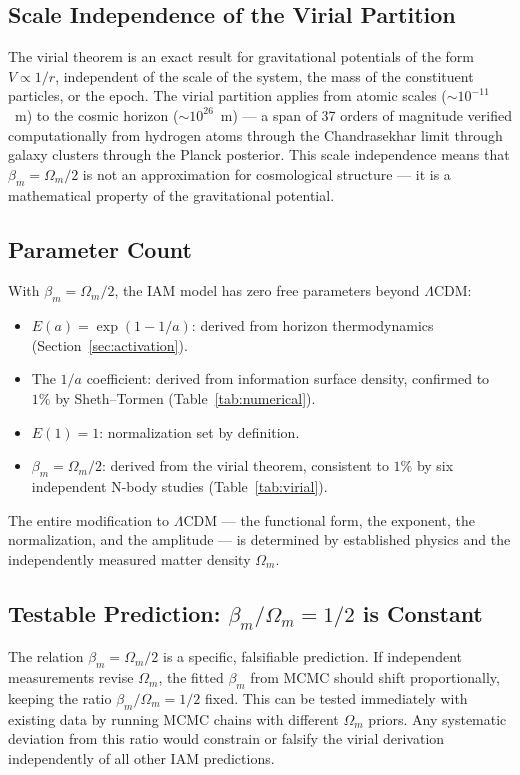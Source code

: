 \documentclass[twocolumn,a4paper,aps,prd,twocolumn,showpacs,notitlepage,superscriptaddress,nofootinbib]{article}
\newcommand{\LCDM}{$\Lambda$CDM}
\newcommand{\betam}{\beta_{m}}
\begin{document}
\subsection{Scale Independence of the Virial Partition}

The virial theorem is an exact result for gravitational potentials of the form
$V \propto 1/r$, independent of the scale of the system, the mass of the
constituent particles, or the epoch.  The virial partition applies from atomic
scales ($\sim 10^{-11}$~m) to the cosmic horizon ($\sim 10^{26}$~m) — a span
of 37 orders of magnitude verified computationally from hydrogen atoms through
the Chandrasekhar limit through galaxy clusters through the Planck
posterior.  This scale independence means that
$\betam = \Omega_m/2$ is not an approximation for cosmological structure — it
is a mathematical property of the gravitational potential.

\subsection{Parameter Count}

With $\betam = \Omega_m/2$, the IAM model has zero free parameters beyond
\LCDM{}:

\begin{itemize}
  \item $E(a) = \exp(1-1/a)$: derived from horizon thermodynamics
    (Section~\ref{sec:activation}).
  \item The $1/a$ coefficient: derived from information surface density,
    confirmed to $1\%$ by Sheth--Tormen (Table~\ref{tab:numerical}).
  \item $E(1) = 1$: normalization set by definition.
  \item $\betam = \Omega_m/2$: derived from the virial theorem, consistent to
    $1\%$ by six independent N-body studies (Table~\ref{tab:virial}).
\end{itemize}

The entire modification to \LCDM{} — the functional form, the exponent, the
normalization, and the amplitude — is determined by established physics and the
independently measured matter density $\Omega_m$.

\subsection{Testable Prediction: $\betam/\Omega_m = 1/2$ is Constant}

The relation $\betam = \Omega_m/2$ is a specific, falsifiable prediction.  If
independent measurements revise $\Omega_m$, the fitted $\betam$ from MCMC
should shift proportionally, keeping the ratio $\betam/\Omega_m = 1/2$ fixed.
This can be tested immediately with existing data by running MCMC chains with
different $\Omega_m$ priors.  Any systematic deviation from this ratio would
constrain or falsify the virial derivation independently of all other IAM
predictions.
\end{document}
